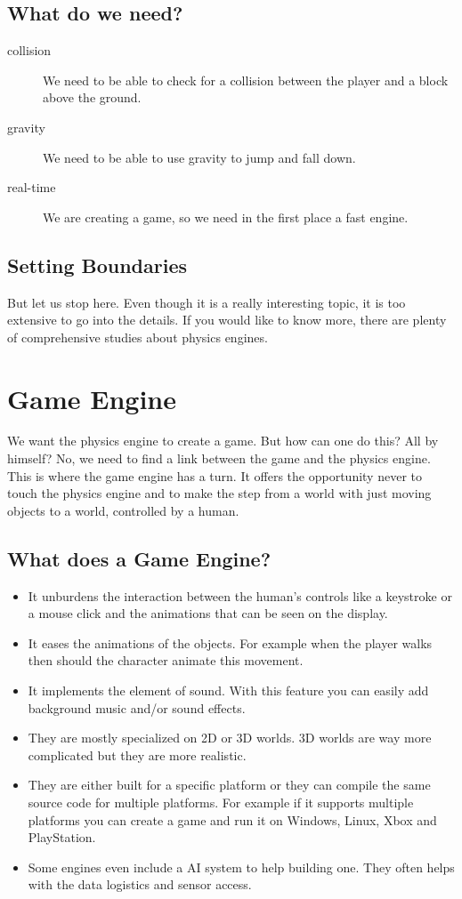 \documentclass[DIV=calc, paper=a4, fontsize=11pt, twocolumn]{scrreprt}	 %
\begin{document}
        \subsection{What do we need?}
        \begin{description}
          \item[collision] We need to be able to check for a collision between the player and a block above the ground.
          \item[gravity] We need to be able to use gravity to jump and fall down. 
          \item[real-time] We are creating a game, so we need in the first place a fast engine.
        \end{description}
        \subsection{Setting Boundaries}
        But let us stop here. Even though it is a really interesting topic, it is too extensive to go into the details. If you would like to know more, there are plenty of comprehensive studies about physics engines.
        \newpage
        \section{Game Engine}
        We want the physics engine to create a game. But how can one do this? All by himself? No, we need to find a link between the game and the physics engine. This is where the game engine has a turn. It offers the opportunity never to touch the physics engine and to make the step from a world with just moving objects to a world, controlled by a human.
        \subsection{What does a Game Engine?}
        \begin{itemize}
          \item It unburdens the interaction between the human's controls like a keystroke or a mouse click and the animations that can be seen on the display.
          \item It eases the animations of the objects. For example when the player walks then should the character animate this movement.
          \item It implements the element of sound. With this feature you can easily add background music and/or sound effects.
          \item They are mostly specialized on 2D or 3D worlds. 3D worlds are way more complicated but they are more realistic.
          \item They are either built for a specific platform or they can compile the same source code for multiple platforms. For example if it supports multiple platforms you can create a game and run it on Windows, Linux, Xbox and PlayStation.
          \item Some engines even include a AI system to help building one. They often helps with the data logistics and sensor access.
        \end{itemize}
\end{document}
